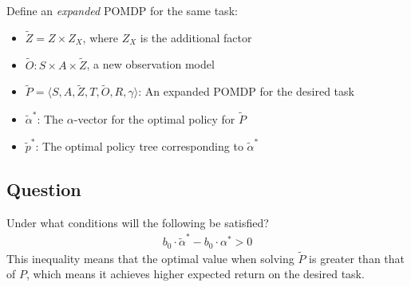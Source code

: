 \documentclass{article}
\newcommand{\td}[1]{\tilde{#1}}
\begin{document}
\noindent Define an \emph{expanded} POMDP for the same task:
\begin{itemize}
\item $\td{Z} = Z\times Z_X$, where $Z_X$ is the additional factor
\item $\td{O}: S\times A\times\td{Z}$, a new observation model
\item $\td{P}=\langle S,A,\td{Z},T,\td{O},R,\gamma  \rangle$: An expanded POMDP for the desired task
\item $\td{\alpha}^*$: The $\alpha$-vector for the optimal policy for $\td{P}$
\item $\td{p}^*$: The optimal policy tree corresponding to $\td{\alpha}^*$
\end{itemize}

\subsection{Question}
Under what conditions will the following be satisfied?
\begin{align}
b_0\cdot \td{\alpha}^* - b_0\cdot \alpha^* > 0
\end{align}
This inequality means that the optimal value when solving $\td{P}$ is greater than that of $P$, which means it achieves higher expected return on the desired task.









\end{document}
